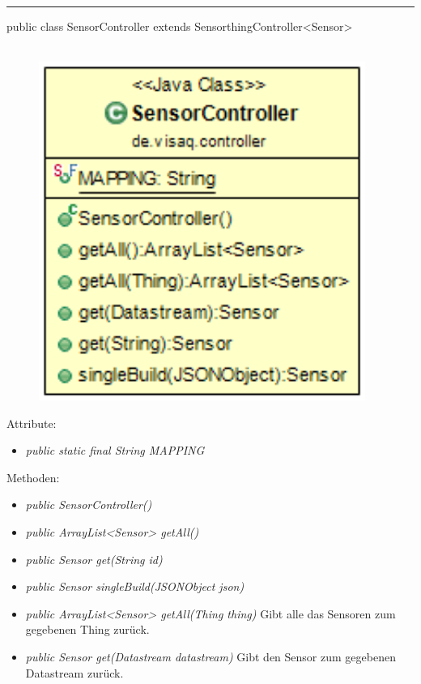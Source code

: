 \rule{\textwidth}{0.4pt}
public class SensorController extends SensorthingController<Sensor>
\\\\
\begin{minipage}{0.3\textwidth}
    \begin{figure}[H]
        {\centering\includegraphics[width=0.95\textwidth]{media/backend/controller/classes/SensorController.png}}
    \end{figure}
    \end{minipage} \hfill
\begin{minipage}{0.7\textwidth}
\end{minipage}

Attribute:
\begin{itemize}
    \item \emph{public static final String MAPPING} \mappingDescription
\end{itemize}
Methoden:
\begin{itemize}
    \item \emph{public SensorController()}
    \item \emph{public ArrayList<Sensor> getAll()}
    \extendsSensorthingController
    \item \emph{public Sensor get(String id)}
    \extendsSensorthingController
    \item \emph{public Sensor singleBuild(JSONObject json)}
    \extendsSensorthingController
    \item \emph{public ArrayList<Sensor> getAll(Thing thing)}
    Gibt alle das Sensoren zum gegebenen Thing zurück.
    \item \emph{public Sensor get(Datastream datastream)}
    Gibt den Sensor zum gegebenen Datastream zurück.
\end{itemize}

